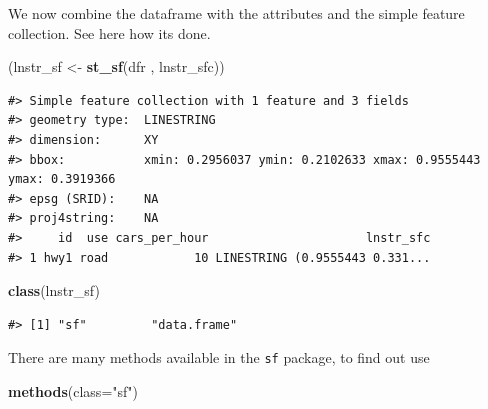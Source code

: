 \documentclass[]{book}
\newenvironment{Shaded}{\begin{snugshade}}{\end{snugshade}}
\newcommand{\KeywordTok}[1]{\textcolor[rgb]{0.13,0.29,0.53}{\textbf{#1}}}
\newcommand{\DataTypeTok}[1]{\textcolor[rgb]{0.13,0.29,0.53}{#1}}
\newcommand{\StringTok}[1]{\textcolor[rgb]{0.31,0.60,0.02}{#1}}
\newcommand{\NormalTok}[1]{#1}
\theoremstyle{definition}
\theoremstyle{definition}
\theoremstyle{definition}
\theoremstyle{remark}
\begin{document}
We now combine the dataframe with the attributes and the simple feature
collection. See here how its done.

\begin{Shaded}
\begin{Highlighting}[]
\NormalTok{(lnstr_sf <-}\StringTok{ }\KeywordTok{st_sf}\NormalTok{(dfr , lnstr_sfc))}
\end{Highlighting}
\end{Shaded}

\begin{verbatim}
#> Simple feature collection with 1 feature and 3 fields
#> geometry type:  LINESTRING
#> dimension:      XY
#> bbox:           xmin: 0.2956037 ymin: 0.2102633 xmax: 0.9555443 ymax: 0.3919366
#> epsg (SRID):    NA
#> proj4string:    NA
#>     id  use cars_per_hour                      lnstr_sfc
#> 1 hwy1 road            10 LINESTRING (0.9555443 0.331...
\end{verbatim}

\begin{Shaded}
\begin{Highlighting}[]
\KeywordTok{class}\NormalTok{(lnstr_sf)}
\end{Highlighting}
\end{Shaded}

\begin{verbatim}
#> [1] "sf"         "data.frame"
\end{verbatim}

There are many methods available in the \texttt{sf} package, to find out
use

\begin{Shaded}
\begin{Highlighting}[]
\KeywordTok{methods}\NormalTok{(}\DataTypeTok{class=}\StringTok{"sf"}\NormalTok{)}
\end{Highlighting}
\end{Shaded}
\end{document}
